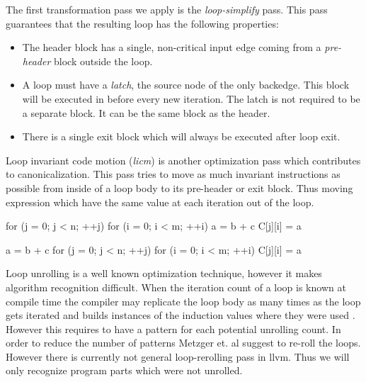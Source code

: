The first transformation pass we apply is the \textit{loop-simplify} pass. This pass guarantees that the resulting loop has the following properties:
\begin{itemize}
\item The header block has a single, non-critical input edge coming from a \textit{pre-header} block outside the loop.
\item A loop must have a \textit{latch}, the source node of the only backedge. This block will be executed in before every new iteration. The latch is not required to be a separate block. It can be the same block as the header.
\item There is a single exit block which will always be executed after loop exit.
\end{itemize}

Loop invariant code motion (\textit{licm}) is another optimization pass which contributes to canonicalization. This pass tries to move as much invariant instructions as possible from inside of a loop body to its pre-header or exit block. Thus moving expression which have the same value at each iteration out of the loop.\\

\noindent\begin{minipage}{.45\textwidth}
\begin{algorithm}[caption={Before licm}]
for (j = 0; j < n; ++j)
	for (i = 0; i < m; ++i) {
		a = b + c
		C[j][i] = a
	}
\end{algorithm}
\end{minipage}\hfill %
\begin{minipage}{.5\textwidth}
\begin{algorithm}[caption={After licm}]
a = b + c
for (j = 0; j < n; ++j)
	for (i = 0; i < m; ++i) {	
	 C[j][i] = a
	}
\end{algorithm}
\end{minipage}

Loop unrolling is a well known optimization technique, however it makes algorithm recognition difficult. When the iteration count of a loop is known at compile time the compiler may replicate the loop body as many times as the loop gets iterated and builds instances of the induction values where they were used \cite[p. 441]{cooper2012engineering}. However this requires to have a pattern for each potential unrolling count. In order to reduce the number of patterns Metzger et. al \cite{2000automatic} suggest to re-roll the loops. However there is currently not general loop-rerolling pass in llvm. Thus we will only recognize program parts which were not unrolled.

